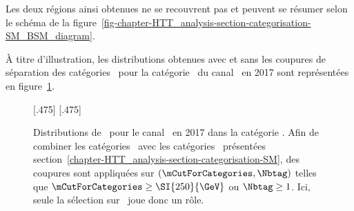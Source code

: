 Les deux régions ainsi obtenues ne se recouvrent pas et peuvent se résumer selon le schéma de la figure~\ref{fig-chapter-HTT_analysis-section-categorisation-SM_BSM_diagram}.
\par
À titre d'illustration, les distributions obtenues avec et sans les coupures de séparation des catégories \CATsm\ pour la catégorie \CATnobtag\ du canal \tauh\tauh\ en 2017 sont représentées en figure~\ref{fig-mTtot_distribs_exemple-SM_sep}.
\begin{figure}[h]
\centering
{}[.475\textwidth]
{}
\hfill
{}[.475\textwidth]
{}

\caption[Distributions de \mTtot\ pour le canal \tauh\tauh\ en 2017 dans la catégorie \CATnobtag.]{Distributions de \mTtot\ pour le canal \tauh\tauh\ en 2017 dans la catégorie \CATnobtag. Afin de combiner les catégories \CATbsm\ avec les catégories \CATsm\ présentées section~\ref{chapter-HTT_analysis-section-categorisation-SM}, des coupures sont appliquées sur $(\mCutForCategories, \Nbtag)$ telles que $\mCutForCategories \geq \SI{250}{\GeV}$ ou $\Nbtag\geq1$. Ici, seule la sélection sur \mCutForCategories\ joue donc un rôle.}
\label{fig-mTtot_distribs_exemple-SM_sep}
\end{figure}